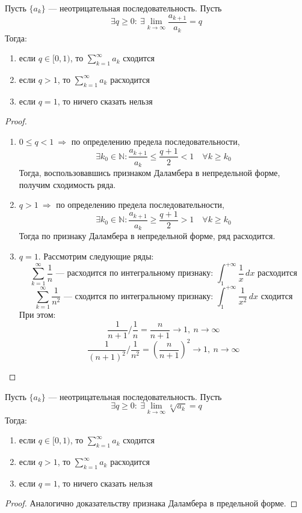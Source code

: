 \documentclass[11pt]{article}
\begin{document}
\begin{theorem}
    Пусть $\{a_k\}$ --- неотрицательная последовательность. Пусть \[\exists q \geq 0: \ \exists \lim_{k \to \infty} \frac{a_{k + 1}}{a_k} = q\] Тогда:
    \begin{enumerate}
        \item если $q \in [0, 1)$, то $\displaystyle \sum_{k = 1}^{\infty} a_k$ сходится
        \item если $q > 1$, то $\displaystyle \sum_{k = 1}^{\infty} a_k$ расходится
        \item если $q = 1$, то ничего сказать нельзя
    \end{enumerate}
\end{theorem}

\begin{proof}
    \begin{enumerate}
        \item $0 \leq q < 1 \ \Longrightarrow$ по определению предела последовательности, \[\exists k_0 \in \mathbb{N}: \frac{a_{k + 1}}{a_k} \leq \frac{q + 1}{2} < 1 
        \quad \forall k \geq k_0\] Тогда, воспользовавшись признаком Даламбера в непредельной форме, получим сходимость ряда.
        \item $q > 1 \ \Longrightarrow$ по определению предела последовательности, \[\exists k_0 \in \mathbb{N}: \frac{a_{k + 1}}{a_k} \geq \frac{q + 1}{2} > 1 
        \quad \forall k \geq k_0\] Тогда по признаку Даламбера в непредельной форме, ряд расходится.
        \item $q = 1$. Рассмотрим следующие ряды: \[\sum_{k = 1}^{\infty} \frac{1}{n} \text{ --- расходится по интегральному признаку: } \int_{1}^{+\infty} \frac{1}{x}\,dx 
        \text{  расходится}\]
        \[\sum_{k = 1}^{\infty} \frac{1}{n^2} \text{ --- сходится по интегральному признаку: } \int_{1}^{+\infty} \frac{1}{x^2}\,dx \text{  сходится}\]
        При этом: \[\frac{1}{n + 1} \bigg/ \frac{1}{n} = \frac{n}{n + 1} \to 1, \ n \to \infty\]
        \[\frac{1}{(n + 1)^2} \bigg/ \frac{1}{n^2} = \left(\frac{n}{n + 1}\right)^2 \to 1, \ n \to \infty\]
    \end{enumerate}
\end{proof}

\begin{theorem}
    Пусть $\{a_k\}$ --- неотрицательная последовательность. Пусть \[\exists q \geq 0: \ \exists \lim_{k \to \infty} \sqrt[k]{a_k} = q\] Тогда:
    \begin{enumerate}
        \item если $q \in [0, 1)$, то $\displaystyle \sum_{k = 1}^{\infty} a_k$ сходится
        \item если $q > 1$, то $\displaystyle \sum_{k = 1}^{\infty} a_k$ расходится
        \item если $q = 1$, то ничего сказать нельзя
    \end{enumerate}
\end{theorem}

\begin{proof}
    Аналогично доказательству признака Даламбера в предельной форме.
\end{proof}
\end{document}
